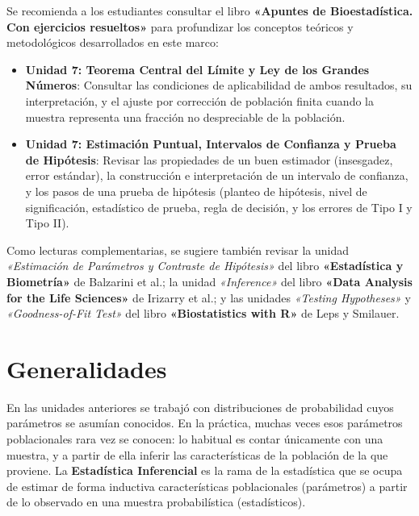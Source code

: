 \documentclass[
  spanish,
  letterpaper,
  DIV=11,
  numbers=noendperiod]{scrreprt}
\providecommand{\tightlist}{%
  \setlength{\itemsep}{0pt}\setlength{\parskip}{0pt}}
\begin{document}
\begin{tcolorbox}[enhanced jigsaw, arc=.35mm, bottomrule=.15mm, bottomtitle=1mm, breakable, colback=white, colbacktitle=quarto-callout-important-color!10!white, colframe=quarto-callout-important-color-frame, coltitle=black, left=2mm, leftrule=.75mm, opacityback=0, opacitybacktitle=0.6, rightrule=.15mm, title=\textcolor{quarto-callout-important-color}{\faExclamation}\hspace{0.5em}{Lectura Sugerida para el Trabajo Práctico}, titlerule=0mm, toprule=.15mm, toptitle=1mm]

Se recomienda a los estudiantes consultar el libro \textbf{«Apuntes de
Bioestadística. Con ejercicios resueltos»} para profundizar los
conceptos teóricos y metodológicos desarrollados en este marco:

\begin{itemize}
\tightlist
\item
  \textbf{Unidad 7: Teorema Central del Límite y Ley de los Grandes
  Números}: Consultar las condiciones de aplicabilidad de ambos
  resultados, su interpretación, y el ajuste por corrección de población
  finita cuando la muestra representa una fracción no despreciable de la
  población.
\item
  \textbf{Unidad 7: Estimación Puntual, Intervalos de Confianza y Prueba
  de Hipótesis}: Revisar las propiedades de un buen estimador
  (insesgadez, error estándar), la construcción e interpretación de un
  intervalo de confianza, y los pasos de una prueba de hipótesis
  (planteo de hipótesis, nivel de significación, estadístico de prueba,
  regla de decisión, y los errores de Tipo I y Tipo II).
\end{itemize}

Como lecturas complementarias, se sugiere también revisar la unidad
\emph{«Estimación de Parámetros y Contraste de Hipótesis»} del libro
\textbf{«Estadística y Biometría»} de Balzarini et al.; la unidad
\emph{«Inference»} del libro \textbf{«Data Analysis for the Life
Sciences»} de Irizarry et al.; y las unidades \emph{«Testing
Hypotheses»} y \emph{«Goodness-of-Fit Test»} del libro
\textbf{«Biostatistics with R»} de Leps y Smilauer.

\end{tcolorbox}

\section{Generalidades}\label{generalidades-3}

En las unidades anteriores se trabajó con distribuciones de probabilidad
cuyos parámetros se asumían conocidos. En la práctica, muchas veces esos
parámetros poblacionales rara vez se conocen: lo habitual es contar
únicamente con una muestra, y a partir de ella inferir las
características de la población de la que proviene. La
\textbf{Estadística Inferencial} es la rama de la estadística que se
ocupa de estimar de forma inductiva características poblacionales
(parámetros) a partir de lo observado en una muestra probabilística
(estadísticos).
\end{document}
